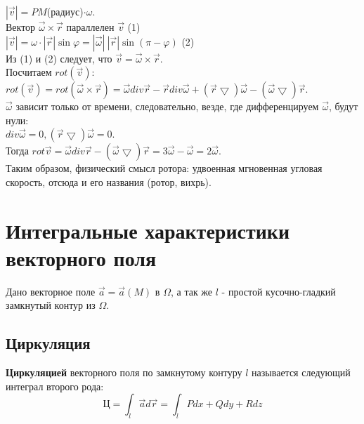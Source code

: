 \documentclass[12pt]{article}
\begin{document}
$|\overrightarrow{v}| = PM$(радиус)$\cdot \omega$.\\
Вектор $\overrightarrow{\omega} \times \overrightarrow{r}$ параллелен $\overrightarrow{v}$ (1)\\
$|\overrightarrow{v}| = \omega \cdot |\overrightarrow{r}| \sin \varphi = |\overrightarrow{\omega}| \ |\overrightarrow{r}| \sin (\pi - \varphi)$ (2)\\
Из (1) и (2) следует, что $\overrightarrow{v} = \overrightarrow{\omega} \times \overrightarrow{r}$.\\
Посчитаем $rot (\overrightarrow{v})$:\\
$rot(\overrightarrow{v})=rot(\overrightarrow{\omega} \times \overrightarrow{r}) = \overrightarrow{\omega} div \overrightarrow{r} - \overrightarrow{r} div \overrightarrow{\omega} + (\overrightarrow{r} \bigtriangledown) \overrightarrow{\omega} - (\overrightarrow{\omega} \bigtriangledown) \overrightarrow{r}$.\\
$\overrightarrow{\omega}$ зависит только от времени, следовательно, везде, где дифференцируем $\overrightarrow{\omega}$, будут нули:\\
$div \overrightarrow{\omega} = 0, (\overrightarrow{r} \bigtriangledown) \overrightarrow{\omega} = 0$.\\
Тогда $rot \overrightarrow{v} = \overrightarrow{\omega} div \overrightarrow{r} - (\overrightarrow{\omega} \bigtriangledown)\overrightarrow{r} = 3\overrightarrow{\omega} - \overrightarrow{\omega} = 2\overrightarrow{\omega}$.\\
Таким образом, физический смысл ротора: удвоенная мгновенная угловая скорость, отсюда и его названия (ротор, вихрь).\\
\section{Интегральные характеристики векторного поля}
Дано векторное поле $\overrightarrow{a} = \overrightarrow{a}(M)$ в $\Omega$, а так же $l$ - простой кусочно-гладкий замкнутый контур из $\Omega$.\\
\subsection{Циркуляция}
\textbf{Циркуляцией} векторного поля по замкнутому контуру $l$ называется следующий интеграл второго рода:\\
$$\text{Ц} = \int_l \overrightarrow{a} d\overrightarrow{r} = \int_l Pdx + Qdy + Rdz$$
\end{document}
